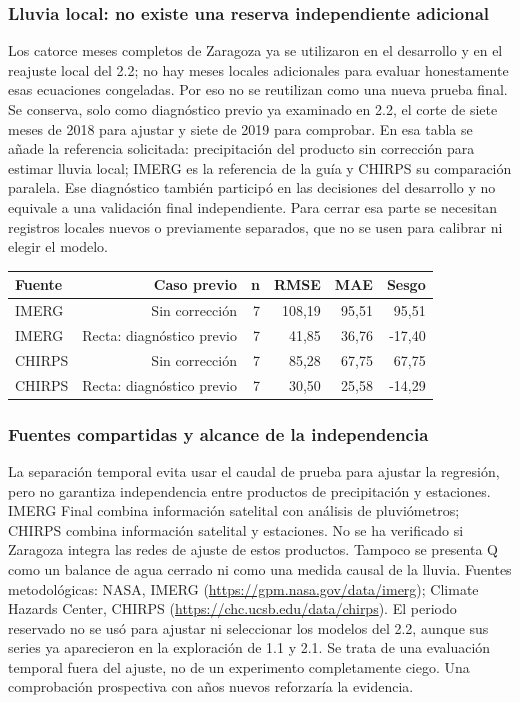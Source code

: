\documentclass[10pt,a4paper]{article}
\begin{document}
\subsubsection*{Lluvia local: no existe una reserva independiente adicional}
Los catorce meses completos de Zaragoza ya se utilizaron en el desarrollo y en el reajuste local del 2.2; no hay meses locales adicionales para evaluar honestamente esas ecuaciones congeladas. Por eso no se reutilizan como una nueva prueba final. Se conserva, solo como diagnóstico previo ya examinado en 2.2, el corte de siete meses de 2018 para ajustar y siete de 2019 para comprobar. En esa tabla se añade la referencia solicitada: precipitación del producto sin corrección para estimar lluvia local; IMERG es la referencia de la guía y CHIRPS su comparación paralela. Ese diagnóstico también participó en las decisiones del desarrollo y no equivale a una validación final independiente. Para cerrar esa parte se necesitan registros locales nuevos o previamente separados, que no se usen para calibrar ni elegir el modelo.
\begin{center}\small\begin{tabular}{lrrrrr}\hline
Fuente & Caso previo & n & RMSE & MAE & Sesgo \\ \hline
IMERG & Sin corrección & 7 & 108,19 & 95,51 & 95,51 \\
IMERG & Recta: diagnóstico previo & 7 & 41,85 & 36,76 & -17,40 \\
CHIRPS & Sin corrección & 7 & 85,28 & 67,75 & 67,75 \\
CHIRPS & Recta: diagnóstico previo & 7 & 30,50 & 25,58 & -14,29 \\
\hline\end{tabular}\end{center}
\subsubsection*{Fuentes compartidas y alcance de la independencia}
La separación temporal evita usar el caudal de prueba para ajustar la regresión, pero no garantiza independencia entre productos de precipitación y estaciones. IMERG Final combina información satelital con análisis de pluviómetros; CHIRPS combina información satelital y estaciones. No se ha verificado si Zaragoza integra las redes de ajuste de estos productos. Tampoco se presenta Q como un balance de agua cerrado ni como una medida causal de la lluvia. Fuentes metodológicas: NASA, IMERG (\url{https://gpm.nasa.gov/data/imerg}); Climate Hazards Center, CHIRPS (\url{https://chc.ucsb.edu/data/chirps}). El periodo reservado no se usó para ajustar ni seleccionar los modelos del 2.2, aunque sus series ya aparecieron en la exploración de 1.1 y 2.1. Se trata de una evaluación temporal fuera del ajuste, no de un experimento completamente ciego. Una comprobación prospectiva con años nuevos reforzaría la evidencia.
\end{document}
